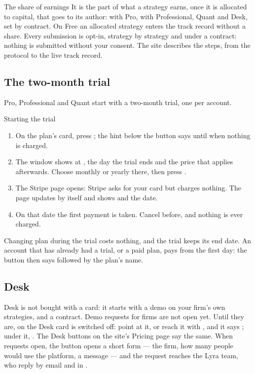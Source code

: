 \begin{nota}{The share of earnings}
It is the part of what a strategy earns, once it is allocated to capital,
that goes to its author:  with Pro,  with Professional,
Quant and Desk, set by contract. On Free an allocated strategy enters the
track record without a share. Every submission is opt-in, strategy by
strategy and under a contract: nothing is submitted without your consent.
The site describes the steps, from the protocol to the live track record.
\end{nota}

\subsection{The two-month trial}

Pro, Professional and Quant start with a two-month trial, one per account.

\begin{pratica}{Starting the trial}
\begin{enumerate}
  \item On the plan's card, press ; the hint
        below the button says until when nothing is charged.
  \item The window shows  at , the day the trial
        ends and the price that applies afterwards. Choose monthly or yearly
        there, then press .
  \item The Stripe page opens: Stripe asks for your card but charges
        nothing. The page updates by itself and shows  and
        the date.
  \item On that date the first payment is taken. Cancel before, and nothing
        is ever charged.
\end{enumerate}
\end{pratica}

\noindent
Changing plan during the trial costs nothing, and the trial keeps its end
date. An account that has already had a trial, or a paid plan, pays from the
first day: the button then says  followed by the plan's
name.

\subsection{Desk}

Desk is not bought with a card: it starts with a demo on your firm's own
strategies, and a contract. Demo requests for firms are not open yet. Until
they are,  on the Desk card is switched off:
point at it, or reach it with , and it says
; under it, . The
Desk buttons on the site's Pricing page say the same. When requests open, the
button opens a short form --- the firm, how many people would use the
platform, a message --- and the request reaches the Lyra team, who reply by
email and in .

